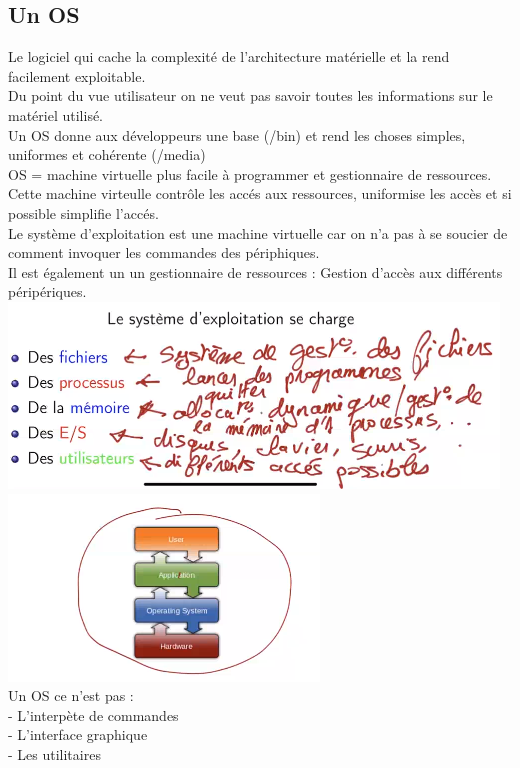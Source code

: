 \documentclass{article}
\begin{document}
    \subsection{Un OS}
    Le logiciel qui cache la complexité de l'architecture matérielle et la rend facilement exploitable. \\
    Du point du vue utilisateur on ne veut pas savoir toutes les informations sur le matériel utilisé. \\
    Un OS donne aux développeurs une base (/bin) et rend les choses simples, uniformes et cohérente (/media) \\
    OS = machine virtuelle plus facile à programmer et gestionnaire de ressources. \\
    Cette machine virteulle contrôle les accés aux ressources, uniformise les accès et si possible simplifie l'accés. \\
    Le système d'exploitation est une machine virtuelle car on n'a pas à se soucier de comment invoquer les commandes des périphiques. \\
    Il est également un un gestionnaire de ressources : Gestion d'accès aux différents péripériques. \\
    \includegraphics{2.PNG}
    \includegraphics{3.PNG} \\
    Un OS ce n'est pas : \\
    - L'interpète de commandes \\
    - L'interface graphique \\
    - Les utilitaires \\
\end{document}
